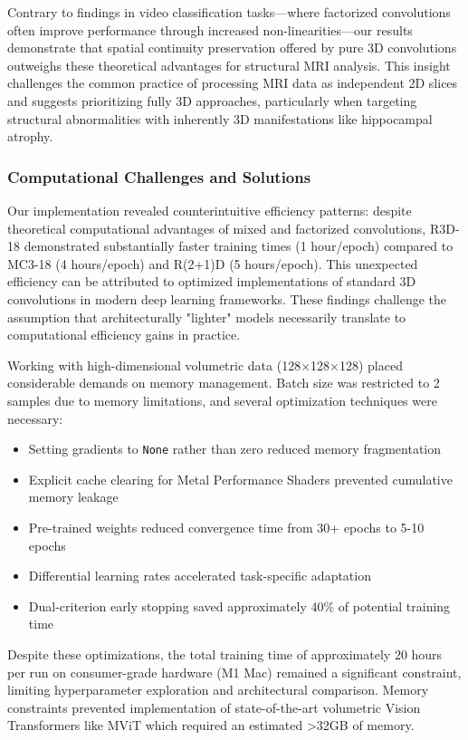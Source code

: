 \documentclass[12pt, a4paper]{article}
\begin{document}
Contrary to findings in video classification tasks—where factorized convolutions often improve performance through increased non-linearities—our results demonstrate that spatial continuity preservation offered by pure 3D convolutions outweighs these theoretical advantages for structural MRI analysis. This insight challenges the common practice of processing MRI data as independent 2D slices and suggests prioritizing fully 3D approaches, particularly when targeting structural abnormalities with inherently 3D manifestations like hippocampal atrophy.

\subsubsection{Computational Challenges and Solutions}

Our implementation revealed counterintuitive efficiency patterns: despite theoretical computational advantages of mixed and factorized convolutions, R3D-18 demonstrated substantially faster training times (1 hour/epoch) compared to MC3-18 (4 hours/epoch) and R(2+1)D (5 hours/epoch). This unexpected efficiency can be attributed to optimized implementations of standard 3D convolutions in modern deep learning frameworks. These findings challenge the assumption that architecturally "lighter" models necessarily translate to computational efficiency gains in practice.

Working with high-dimensional volumetric data (128×128×128) placed considerable demands on memory management. Batch size was restricted to 2 samples due to memory limitations, and several optimization techniques were necessary:

\begin{itemize}
    \item Setting gradients to \texttt{None} rather than zero reduced memory fragmentation
    \item Explicit cache clearing for Metal Performance Shaders prevented cumulative memory leakage
    \item Pre-trained weights reduced convergence time from 30+ epochs to 5-10 epochs
    \item Differential learning rates accelerated task-specific adaptation
    \item Dual-criterion early stopping saved approximately 40\% of potential training time
\end{itemize}

Despite these optimizations, the total training time of approximately 20 hours per run on consumer-grade hardware (M1 Mac) remained a significant constraint, limiting hyperparameter exploration and architectural comparison. Memory constraints prevented implementation of state-of-the-art volumetric Vision Transformers like MViT which required an estimated >32GB of memory.
\end{document}
